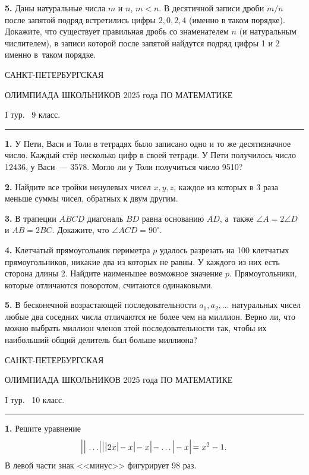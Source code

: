 \documentclass[12pt,a4paper]{article}
\def\q#1.{{\bf #1. }}
\begin{document}
\q5. Даны натуральные числа $m$ и $n$, $m<n$. В десятичной записи дроби $m/n$ после запятой подряд встретились цифры $2, 0, 2, 4$ (именно в таком порядке). Докажите, что существует правильная дробь со знаменателем $n$ (и натуральным числителем), в записи которой после запятой найдутся подряд цифры 1 и 2 именно в~таком порядке.


\clearpage

\centerline{\sc САНКТ-ПЕТЕРБУРГСКАЯ}
\centerline{\sc ОЛИМПИАДА ШКОЛЬНИКОВ 2025 года ПО МАТЕМАТИКЕ}
\centerline{\sc I тур. \ 9 класс.}
\medskip
\hrule
\bigskip

\q1. У Пети, Васи и Толи в тетрадях было записано одно и то же десятизначное число. Каждый стёр несколько цифр в своей тетради. У Пети получилось число 12436, у Васи~--- 3578. Могло ли у Толи получиться число 9510?

\q2. Найдите все тройки ненулевых чисел $x, y, z$, каждое из которых в 3 раза меньше суммы чисел, обратных к двум другим.

\q3. В трапеции $ABCD$ диагональ $BD$ равна основанию $AD$, а~также $\angle A = 2 \angle D$ и $AB = 2BC$. Докажите, что $\angle ACD = 90^\circ$.

\q4. Клетчатый прямоугольник периметра $p$ удалось разрезать на 100 клетчатых прямоугольников, никакие два из которых не равны. У каждого из них есть сторона длины 2. Найдите наименьшее возможное значение $p$. Прямоугольники, которые отличаются поворотом, считаются одинаковыми.

\q5. В бесконечной возрастающей последовательности $a_1, a_2, \ldots$ натуральных чисел любые два соседних числа отличаются не более чем на миллион. Верно ли, что можно выбрать миллион членов этой последовательности так, чтобы их наибольший общий делитель был больше миллиона?


\clearpage

\centerline{\sc САНКТ-ПЕТЕРБУРГСКАЯ}
\centerline{\sc ОЛИМПИАДА ШКОЛЬНИКОВ 2025 года ПО МАТЕМАТИКЕ}
\centerline{\sc I тур. \ 10 класс.}
\medskip
\hrule
\bigskip

\q1. Решите уравнение 
$$
\rule[-5.2pt]{0.5pt}{17.4pt}\hspace{3pt}
\rule[-4.4pt]{0.5pt}{15.8pt}\hspace{3pt}
\dots
\rule[-3.6pt]{0.5pt}{14.2pt}\hspace{3pt}
\rule[-2.8pt]{0.5pt}{12.6pt}\hspace{3pt}
\rule[-2pt]{0.5pt}{11pt}\hspace{1.5pt}2x
\hspace{1.5pt}\rule[-2pt]{0.5pt}{11pt}
-x
\hspace{1.5pt}\rule[-2.8pt]{0.5pt}{12.6pt}
-x
\hspace{1.5pt}\rule[-3.6pt]{0.5pt}{14.2pt}
-\dots
\hspace{1.5pt}\rule[-4.4pt]{0.5pt}{15.8pt}
-x
\hspace{1.5pt}\rule[-5.2pt]{0.5pt}{17.4pt}
=x^2-1.
$$
В левой части знак <<минус>> фигурирует 98 раз.
\end{document}
